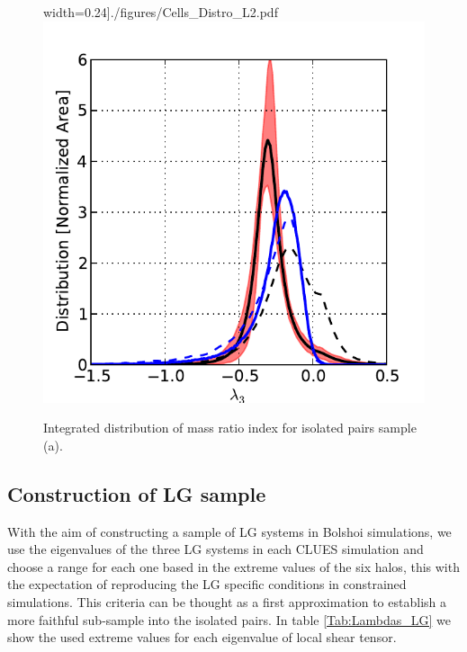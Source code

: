 \documentclass[usenatbib]{latex/mn2e}
\begin{document}
\begin{figure}
\begin{center}
width=0.24\textheight]{./figures/Cells_Distro_L2.pdf}
\includegraphics[trim = 0mm 0mm 5mm 8mm, clip, keepaspectratio=true,
width=0.24\textheight]{./figures/Cells_Distro_L3.pdf}

\caption{\small Integrated distribution of mass ratio index for isolated 
pairs sample (a).}

\label{fig:lambda_histogram}

\vspace{0.1 cm}
\end{center}
\end{figure}


\subsection{Construction of LG sample}
\label{subsec:LG_construction}


With the aim of constructing a sample of LG systems in Bolshoi simulations, 
we use the eigenvalues of the three LG systems in each CLUES simulation 
and choose a range for each one based in the extreme values of the six 
halos, this with the expectation of reproducing the LG specific conditions 
in constrained simulations. This criteria can be thought as a first 
approximation to establish a more faithful sub-sample into the isolated 
pairs. In table \ref{Tab:Lambdas_LG} we show the used extreme values for 
each eigenvalue of local shear tensor.
\end{document}
